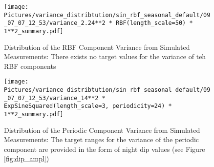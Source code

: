 \begin{figure}[h!]
    \centering
    \texttt{[image: 
       Pictures/variance\_distribtution/sin\_rbf\_seasonal\_default/09\_07\_07\_12\_53/variance\_2.24**2 * RBF(length\_scale=50) * 1**2\_summary.pdf]}
    \caption[Distribution of the RBF Component Variance from Simulated Measurements]{
        Distribution of the RBF Component Variance from Simulated Measurements:
        There exists no target values for the variance of teh RBF components}
    \label{fig:var_rbf}
\end{figure}


\begin{figure}[h!]
    \centering
    \texttt{[image: 
       Pictures/variance\_distribtution/sin\_rbf\_seasonal\_default/09\_07\_07\_12\_53/variance\_14**2 * ExpSineSquared(length\_scale=3, periodicity=24) * 1**2\_summary.pdf]}
    \caption[Distribution of the Periodic Component Variance from Simulated Measurements]{
        Distribution of the Periodic Component Variance from Simulated Measurements:
        The target ranges for the variance of the periodic component are provided in the form of night dip values (see Figure \ref{fig:dip_ampl})}
    \label{fig:var_periodc}
\end{figure}

